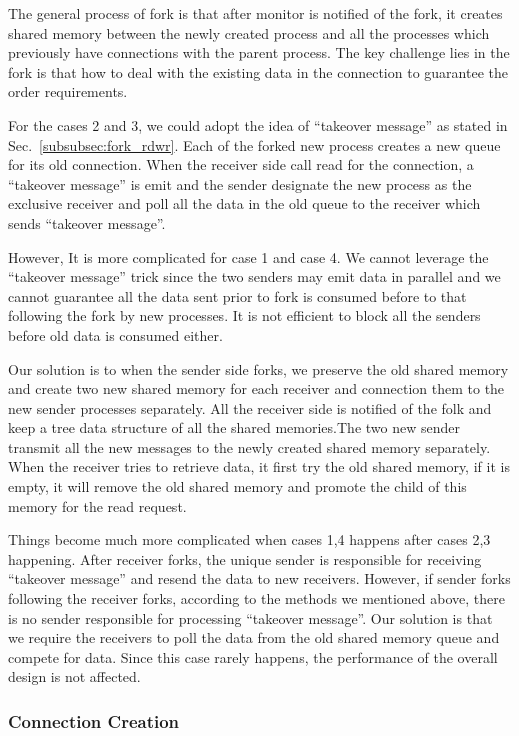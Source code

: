 The general process of fork is that after monitor is notified of the fork, it creates shared memory between the newly created process and all the processes which previously have connections with the parent process. The key challenge lies in the fork is that how to deal with the existing data in the connection to guarantee the order requirements.

For the cases 2 and 3, we could adopt the idea of ``takeover message'' as stated in Sec.~\ref{subsubsec:fork_rdwr}. Each of the forked new process creates a new queue for its old connection. When the receiver side call read for the connection, a ``takeover message'' is emit and the sender designate the new process as the exclusive receiver and poll all the data in the old queue to the receiver which sends ``takeover message''.

However, It is more complicated for case 1 and case 4. We cannot leverage the ``takeover message'' trick since the two senders may emit data in parallel and we cannot guarantee all the data sent prior to fork is consumed before to that following the fork by new processes. It is not efficient to block all the senders before old data is consumed either.

Our solution is to when the sender side forks, we preserve the old shared memory and create two new shared memory for each receiver and connection them to the new sender processes separately. All the receiver side is notified of the folk and keep a tree data structure of all the shared memories.The two new sender transmit all the new messages to the newly created shared memory separately. When the receiver tries to retrieve data, it first try the old shared memory, if it is empty, it will remove the old shared memory and promote the child of this memory for the read request. 

Things become much more complicated when cases 1,4 happens after cases 2,3 happening. After receiver forks, the unique sender is responsible for receiving ``takeover message'' and resend the data to new receivers. However, if sender forks following the receiver forks, according to the methods we mentioned above, there is no sender responsible for processing ``takeover message''. Our solution is that we require the receivers to poll the data from the old shared memory queue and compete for data. Since this case rarely happens, the performance of the overall design is not affected.

\subsubsection{Connection Creation}
\label{subsubsec:fork_new}

